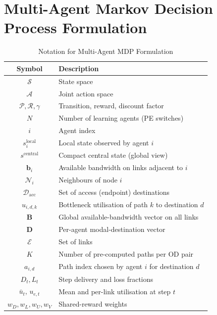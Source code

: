 \documentclass[10pt,journal,comsoc]{IEEEtran}
\begin{document}
\section{Multi-Agent Markov Decision Process Formulation} \label{model}

\begin{table}[!t]
  \centering
  \caption{Notation for Multi-Agent MDP Formulation}
  \label{tab:mamdp_notation}
  \begin{tabular}{cl}
    \toprule
    \textbf{Symbol} & \textbf{Description} \\
    \midrule
    $\mathcal{S}$ & State space \\
    $\mathcal{A}$ & Joint action space \\
    $\mathcal{P},\mathcal{R},\gamma$ & Transition, reward, discount factor \\
    $N$ & Number of learning agents (PE switches) \\
    $i$ & Agent index \\
    \midrule
    $s_i^{\text{local}}$ & Local state observed by agent $i$ \\
    $s^{\text{central}}$ & Compact central state (global view) \\
    $\mathbf{b}_i$ & Available bandwidth on links adjacent to $i$ \\
    $\mathcal{N}_i$ & Neighbours of node $i$ \\
    $\mathcal{D}_{\text{acc}}$ & Set of access (endpoint) destinations \\
    $u_{i,d,k}$ & Bottleneck utilisation of path $k$ to destination $d$ \\
    $\mathbf{B}$ & Global available-bandwidth vector on all links \\
    $\mathbf{D}$ & Per-agent modal-destination vector \\
    $\mathcal{E}$ & Set of links \\
    $K$ & Number of pre-computed paths per OD pair \\
    $a_{i,d}$ & Path index chosen by agent $i$ for destination $d$ \\
    \midrule
    $D_t, L_t$ & Step delivery and loss fractions \\
    $\bar{u}_t$, $u_{e,t}$ & Mean and per-link utilisation at step $t$ \\
    $w_D,w_L,w_U,w_V$ & Shared-reward weights \\
    \bottomrule
  \end{tabular}
\end{table}
\end{document}
